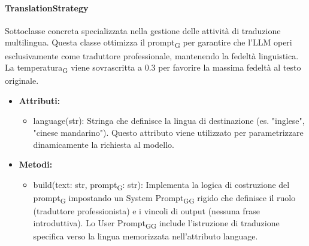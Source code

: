 \documentclass[11pt,a4paper]{article}
\newcommand{\gls}[1]{#1\textsubscript{G}}
\begin{document}
\paragraph{TranslationStrategy} 
Sottoclasse concreta specializzata nella gestione delle attività di traduzione multilingua. Questa classe ottimizza il \gls{prompt} per garantire che l'LLM operi esclusivamente come traduttore professionale, mantenendo la fedeltà linguistica. La \gls{temperatura} viene sovrascritta a 0.3 per favorire la massima fedeltà al testo originale.
\begin{itemize}
    \item \textbf{Attributi:}
\begin{itemize}
    \item language(str): Stringa che definisce la lingua di destinazione (es. "inglese", "cinese mandarino"). Questo attributo viene utilizzato per parametrizzare dinamicamente la richiesta al modello.
\end{itemize}
\item \textbf{Metodi:}
\begin{itemize}
    \item build(text: str, \gls{prompt}: str): Implementa la logica di costruzione del \gls{prompt} impostando un \gls{System \gls{Prompt}} rigido che definisce il ruolo (traduttore professionista) e i vincoli di output (nessuna frase introduttiva). Lo \gls{User \gls{Prompt}} include l'istruzione di traduzione specifica verso la lingua memorizzata nell'attributo language.
\end{itemize}
\end{itemize}
\end{document}
